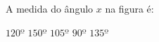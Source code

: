 A medida do \^angulo $x$ na figura \'e:

\parbox{0.25\linewidth}{

$120º$
$150º$
$105º$
$90º$
$135º$

}\parbox{0.74\linewidth}{
\begin{center}
\vspace{-6mm}
\vspace{-9mm}
\end{center}
}


